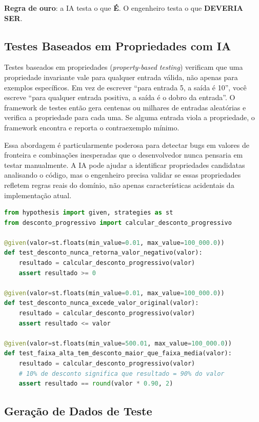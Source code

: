 \textbf{Regra de ouro}: a IA testa o que \textbf{É}. O engenheiro testa o que
\textbf{DEVERIA SER}.

\subsection{Testes Baseados em Propriedades com IA}

Testes baseados em propriedades (\textit{property-based testing}) verificam que
uma propriedade invariante vale para qualquer entrada válida, não apenas para
exemplos específicos. Em vez de escrever ``para entrada 5, a saída é 10'', você
escreve ``para qualquer entrada positiva, a saída é o dobro da entrada''. O
framework de testes então gera centenas ou milhares de entradas aleatórias e
verifica a propriedade para cada uma. Se alguma entrada viola a propriedade, o
framework encontra e reporta o contraexemplo mínimo.

Essa abordagem é particularmente poderosa para detectar bugs em valores de
fronteira e combinações inesperadas que o desenvolvedor nunca pensaria em testar
manualmente. A IA pode ajudar a identificar propriedades candidatas analisando o
código, mas o engenheiro precisa validar se essas propriedades refletem regras
reais do domínio, não apenas características acidentais da implementação atual.

\begin{lstlisting}[language=Python, caption={Teste baseado em propriedades com Hypothesis}]
from hypothesis import given, strategies as st
from desconto_progressivo import calcular_desconto_progressivo

@given(valor=st.floats(min_value=0.01, max_value=100_000.0))
def test_desconto_nunca_retorna_valor_negativo(valor):
    resultado = calcular_desconto_progressivo(valor)
    assert resultado >= 0

@given(valor=st.floats(min_value=0.01, max_value=100_000.0))
def test_desconto_nunca_excede_valor_original(valor):
    resultado = calcular_desconto_progressivo(valor)
    assert resultado <= valor

@given(valor=st.floats(min_value=500.01, max_value=100_000.0))
def test_faixa_alta_tem_desconto_maior_que_faixa_media(valor):
    resultado = calcular_desconto_progressivo(valor)
    # 10% de desconto significa que resultado = 90% do valor
    assert resultado == round(valor * 0.90, 2)
\end{lstlisting}

\subsection{Geração de Dados de Teste}

